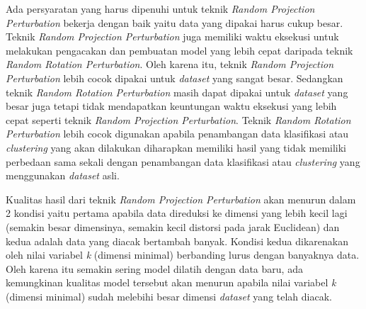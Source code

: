 Ada persyaratan yang harus dipenuhi untuk teknik \textit{Random Projection Perturbation} bekerja dengan baik yaitu data yang dipakai harus cukup besar. Teknik \textit{Random Projection Perturbation} juga memiliki waktu eksekusi untuk melakukan pengacakan dan pembuatan model yang lebih cepat daripada teknik \textit{Random Rotation Perturbation}. Oleh karena itu, teknik \textit{Random Projection Perturbation} lebih cocok dipakai untuk \textit{dataset} yang sangat besar. Sedangkan teknik \textit{Random Rotation Perturbation} masih dapat dipakai untuk \textit{dataset} yang besar juga tetapi tidak mendapatkan keuntungan waktu eksekusi yang lebih cepat seperti teknik \textit{Random Projection Perturbation}. Teknik \textit{Random Rotation Perturbation} lebih cocok digunakan apabila penambangan data klasifikasi atau \textit{clustering} yang akan dilakukan diharapkan memiliki hasil yang tidak memiliki perbedaan sama sekali dengan penambangan data klasifikasi atau \textit{clustering} yang menggunakan \textit{dataset} asli. 

Kualitas hasil dari teknik \textit{Random Projection Perturbation} akan menurun dalam 2 kondisi yaitu pertama apabila data direduksi ke dimensi yang lebih kecil lagi (semakin besar dimensinya, semakin kecil distorsi pada jarak Euclidean) dan kedua adalah data yang diacak bertambah banyak. Kondisi kedua dikarenakan oleh nilai variabel \textit{k} (dimensi minimal) berbanding lurus dengan banyaknya data. Oleh karena itu semakin sering model dilatih dengan data baru, ada kemungkinan kualitas model tersebut akan menurun apabila nilai variabel \textit{k} (dimensi minimal) sudah melebihi besar dimensi \textit{dataset} yang telah diacak.
